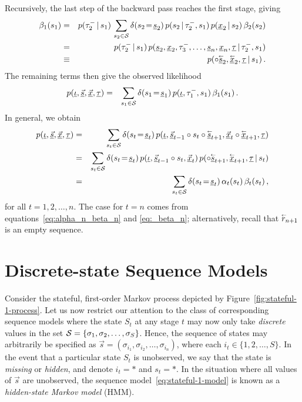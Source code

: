 \documentclass[a4paper]{article}
\newcommand{\rvec}[1]{\accentset{\leftarrow}{#1}}
\newcommand{\ui}{\underline{\iota}}
\newcommand{\ut}{\underline{\tau}}
\newcommand{\tm}{\tau^{-}}
\begin{document}
Recursively, the last step of the backward pass reaches the first stage, giving
\begin{eqnarray}
  \beta_{1}(s_{1}) & = &
p(\tm_2\,|\,s_{1})\,\sum_{s_2\in{\cal S}}\delta(s_2\!=\!\underline{s}_2)\,
p(s_2\,|\,\tm_2,s_{1})\,p(\underline{x}_{2}\,|\,s_2)
\,\beta_2(s_2)
\nonumber\\&=&
p(\tm_2\,|\,s_{1})\,
p(\underline{s}_2,\underline{x}_2,\tm_3,\ldots,\underline{s}_n,\underline{x}_n,\ut\,|\,\tm_2,s_{1})
\nonumber\\&\equiv&
p(\circ\underline{\rvec{s}}_2,\underline{\rvec{x}}_2,\ut\,|\,s_{1})\,.
\end{eqnarray}
The remaining terms then give the observed likelihood
\begin{eqnarray}
   p(\ui,\underline{\vec{s}},\underline{\vec{x}},\ut) 
& = & 
   \sum_{s_1\in{\cal S}}\delta(s_1\!=\!\underline{s}_1)\,p(\ui,\tm_1,s_1)\,\beta_1(s_1)\,.
\end{eqnarray}
In general, we obtain
\begin{eqnarray}
   p(\ui,\underline{\vec{s}},\underline{\vec{x}},\ut) 
& = & 
   \sum_{s_t\in{\cal S}}\delta(s_t\!=\!\underline{s}_t)\,
   p(\ui,\underline{\vec{s}}_{t-1}\circ s_t\circ\underline{\rvec{s}}_{t+1},
\underline{\vec{x}}_t\circ\underline{\rvec{x}}_{t+1},\ut) 
\nonumber\\&=&
   \sum_{s_t\in{\cal S}}\delta(s_t\!=\!\underline{s}_t)\,
p(\ui,\underline{\vec{s}}_{t-1}\circ s_t,\underline{\vec{x}}_t)
\,p(\circ\underline{\rvec{s}}_{t+1},\underline{\rvec{x}}_{t+1},\ut\,|\,s_{t})
\nonumber\\&=&
   \sum_{s_t\in{\cal S}}\delta(s_t\!=\!\underline{s}_t)\,\alpha_t(s_t)\,\beta_t(s_t)\,,
\end{eqnarray}
for all $t=1,2,\ldots,n$. The case for $t=n$ comes from equations~\eqref{eq:alpha_n_beta_n} and \eqref{eq:_beta_n}; alternatively, recall that $\rvec{r}_{n+1}$ is an empty sequence.

\section{Discrete-state Sequence Models}\label{sec:discrete-state}

Consider the stateful, first-order Markov process depicted by Figure~\ref{fig:stateful-1-process}.
Let us now restrict our attention to the class of corresponding sequence models where
the state $S_t$ at any stage $t$ may now only take {\em discrete} values in the set 
${\cal S}=\{\sigma_1,\sigma_2,\ldots,\sigma_S\}$.
Hence, the sequence of states may arbitrarily be specified as $\vec{s}=(\sigma_{i_1},\sigma_{i_2},\ldots,\sigma_{i_n})$,
where each $i_t\in\{1,2,\ldots,S\}$.
In the event that a particular state $S_t$ is unobserved, we say that the state is {\em missing} or {\em hidden},
and denote $i_t=*$ and $s_t=*$. In the situation where all values of $\vec{s}$ are unobserved,
the sequence model~\eqref{eq:stateful-1-model} is known as a {\em hidden-state Markov model} (HMM).
\end{document}
